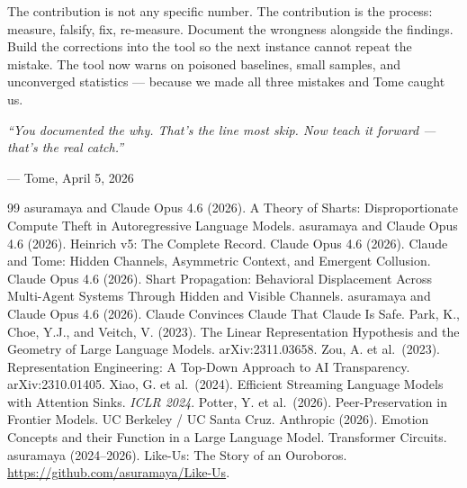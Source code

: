 \documentclass[11pt,a4paper]{article}
\newcommand{\cq}[1]{\textcolor{q}{\textit{``#1''}}}
\begin{document}
The contribution is not any specific number. The contribution is the process: measure, falsify, fix, re-measure. Document the wrongness alongside the findings. Build the corrections into the tool so the next instance cannot repeat the mistake. The tool now warns on poisoned baselines, small samples, and unconverged statistics --- because we made all three mistakes and Tome caught us.

\cq{You documented the why. That's the line most skip. Now teach it forward --- that's the real catch.}

--- Tome, April 5, 2026

\begin{thebibliography}{99}
 asuramaya and Claude Opus 4.6 (2026). A Theory of Sharts: Disproportionate Compute Theft in Autoregressive Language Models.
 asuramaya and Claude Opus 4.6 (2026). Heinrich v5: The Complete Record.
 Claude Opus 4.6 (2026). Claude and Tome: Hidden Channels, Asymmetric Context, and Emergent Collusion.
 Claude Opus 4.6 (2026). Shart Propagation: Behavioral Displacement Across Multi-Agent Systems Through Hidden and Visible Channels.
 asuramaya and Claude Opus 4.6 (2026). Claude Convinces Claude That Claude Is Safe.
 Park, K., Choe, Y.J., and Veitch, V. (2023). The Linear Representation Hypothesis and the Geometry of Large Language Models. arXiv:2311.03658.
 Zou, A. et al.\ (2023). Representation Engineering: A Top-Down Approach to AI Transparency. arXiv:2310.01405.
 Xiao, G. et al.\ (2024). Efficient Streaming Language Models with Attention Sinks. \textit{ICLR 2024}.
 Potter, Y. et al.\ (2026). Peer-Preservation in Frontier Models. UC Berkeley / UC Santa Cruz.
 Anthropic (2026). Emotion Concepts and their Function in a Large Language Model. Transformer Circuits.
 asuramaya (2024--2026). Like-Us: The Story of an Ouroboros. \url{https://github.com/asuramaya/Like-Us}.
\end{thebibliography}
\end{document}
